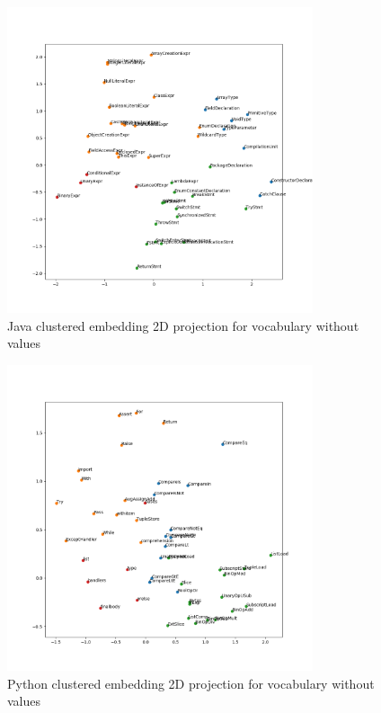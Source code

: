 \begin{figure}
  \centering\includegraphics[height=9cm]{images/java-embeddings.png}
  \caption{\label{fig:java-embeddings}Java clustered embedding 2D projection for vocabulary without
  values}
\end{figure}

\begin{figure}
  \centering\includegraphics[height=9cm]{images/python-embeddings.png}
  \caption{\label{fig:python-embeddings}Python clustered embedding 2D projection for vocabulary without
  values}
\end{figure}

